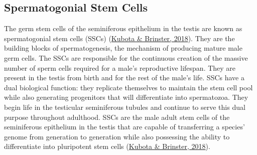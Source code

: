 \documentclass[12pt,twoside]{reedthesis}
\begin{document}
\hypertarget{spermatogonial-stem-cells}{%
\subsection*{Spermatogonial Stem Cells}\label{spermatogonial-stem-cells}}

The germ stem cells of the seminiferous epithelium in the testis are
known as spermatogonial stem cells (SSCs) (\protect\hyperlink{ref-kubota2018}{Kubota \& Brinster, 2018}). They are the
building blocks of spermatogenesis, the mechanism of producing mature
male germ cells. The SSCs are responsible for the continuous creation of
the massive number of sperm cells required for a male's reproductive
lifespan. They are present in the testis from birth and for the rest of
the male's life. SSCs have a dual biological function: they replicate
themselves to maintain the stem cell pool while also generating
progenitors that will differentiate into spermatozoa. They begin life in
the testicular seminiferous tubules and continue to serve this dual
purpose throughout adulthood. SSCs are the male adult stem cells of the
seminiferous epithelium in the testis that are capable of transferring a
species' genome from generation to generation while also possessing the
ability to differentiate into pluripotent stem cells (\protect\hyperlink{ref-kubota2018}{Kubota \& Brinster, 2018}).
\end{document}
